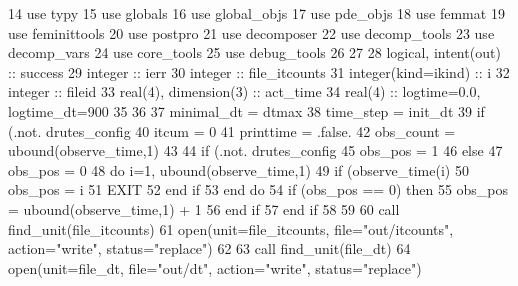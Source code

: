 \begin{DoxyCode}
14       \textcolor{keywordtype}{use }typy
15       \textcolor{keywordtype}{use }globals
16       \textcolor{keywordtype}{use }global_objs
17       \textcolor{keywordtype}{use }pde_objs
18       \textcolor{keywordtype}{use }femmat
19       \textcolor{keywordtype}{use }feminittools
20       \textcolor{keywordtype}{use }postpro
21       \textcolor{keywordtype}{use }decomposer
22       \textcolor{keywordtype}{use }decomp_tools
23       \textcolor{keywordtype}{use }decomp_vars
24       \textcolor{keywordtype}{use }core_tools
25       \textcolor{keywordtype}{use }debug_tools
26 
27       
28       \textcolor{keywordtype}{logical}, \textcolor{keywordtype}{intent(out)} :: success
29       \textcolor{keywordtype}{integer} :: ierr
30       \textcolor{keywordtype}{integer} :: file\_itcounts
31       \textcolor{keywordtype}{integer(kind=ikind)} :: i
32       \textcolor{keywordtype}{integer} :: fileid
33       \textcolor{keywordtype}{real(4)}, \textcolor{keywordtype}{dimension(3)} :: act\_time
34       \textcolor{keywordtype}{real(4)} :: logtime=0.0, logtime\_dt=900
35       
36 
37       minimal_dt = dtmax
38       time_step = init_dt
39       \textcolor{keywordflow}{if} (.not. drutes_config%
40       itcum = 0
41       printtime = .false.
42       obs\_count = ubound(observe_time,1)
43       
44       \textcolor{keywordflow}{if} (.not. drutes_config%
45         obs\_pos = 1
46       \textcolor{keywordflow}{else}
47         obs\_pos = 0
48         \textcolor{keywordflow}{do} i=1, ubound(observe_time,1)
49           \textcolor{keywordflow}{if} (observe_time(i)%
50             obs\_pos = i
51             \textcolor{keywordflow}{EXIT}
52 \textcolor{keywordflow}{          end if}
53 \textcolor{keywordflow}{        end do}
54         \textcolor{keywordflow}{if} (obs\_pos == 0) \textcolor{keywordflow}{then}
55           obs\_pos = ubound(observe_time,1) + 1
56 \textcolor{keywordflow}{        end if}
57 \textcolor{keywordflow}{      end if}
58 
59 
60       \textcolor{keyword}{call }find_unit(file\_itcounts)
61       \textcolor{keyword}{open}(unit=file\_itcounts, file=\textcolor{stringliteral}{"out/itcounts"}, action=\textcolor{stringliteral}{"write"}, status\textcolor{comment}{=}\textcolor{stringliteral}{"replace"}\textcolor{comment}{)}
62 \textcolor{comment}{}
63 \textcolor{comment}{      }\textcolor{keyword}{call }find_unit(file_dt)
64       \textcolor{keyword}{open}(unit=file_dt, file=\textcolor{stringliteral}{"out/dt"}, action=\textcolor{stringliteral}{"write"}, status=\textcolor{stringliteral}{"replace"}\textcolor{comment}{)}

\end{DoxyCode}
